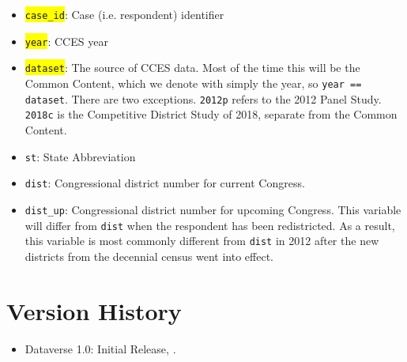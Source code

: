 \documentclass[12pt]{article}
\begin{document}
	
\begin{itemize}
\item \colorbox{yellow}{\texttt{case\_id}}:  Case (i.e. respondent) identifier

\begin{center}

\end{center}

\item  \colorbox{yellow}{\texttt{year}}: CCES year

\item \colorbox{yellow}{\texttt{dataset}}: The source of CCES data. Most of the time this will be the Common Content, which we denote with simply the year, so \texttt{year == dataset}. There are two exceptions. \texttt{2012p} refers to the 2012 Panel Study. \texttt{2018c} is the Competitive District Study of 2018, separate from the Common Content.

\item \texttt{st}: State Abbreviation

\item \texttt{dist}: Congressional district number for current Congress. 

\item \texttt{dist\_up}: Congressional district number for upcoming Congress. This variable will differ from \texttt{dist} when the respondent has been redistricted. As a result, this variable is most commonly different from \texttt{dist} in 2012 after the new districts from the decennial census went into effect. 
\end{itemize}




\section{Version History}

\begin{itemize}
\item Dataverse 1.0: Initial Release, .
\end{itemize}	
	
\end{document}
